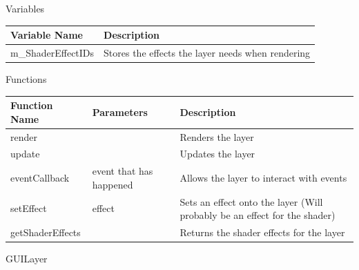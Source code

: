 \documentclass{article}
\begin{document}
                \begin{center}
                    Variables
                    \begin{tabular}{ | m{} | m{} | }
                        \hline
                        \textbf{Variable Name} & \textbf{Description} \\
                        \hline
                        m\_ShaderEffectIDs & Stores the effects the layer needs when rendering \\
                        \hline
                    \end{tabular}
                    Functions
                    \begin{tabular}{ | m{} | m{}| m{} | }
                        \hline
                        \textbf{Function Name} & \textbf{Parameters} & \textbf{Description} \\
                        \hline
                        render & & Renders the layer \\
                        \hline
                        update & & Updates the layer \\
                        \hline
                        eventCallback & event that has happened & Allows the layer to interact with events \\
                        \hline
                        setEffect & effect & Sets an effect onto the layer (Will probably be an effect for the shader) \\
                        \hline
                        getShaderEffects & & Returns the shader effects for the layer \\
                        \hline
                    \end{tabular}
                \end{center}
                GUILayer
\end{document}
